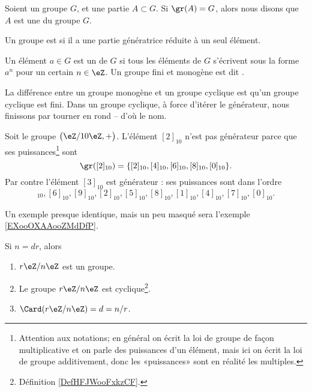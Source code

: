 \begin{definition}  \label{DEFooWMFVooLDqVxR}
	Soient un groupe \( G\), et une partie \( A\subset G\). Si \( \gr(A)=G\), alors nous disons que \( A\) est une  du groupe \( G\).

	Un groupe est  si il a une partie génératrice réduite à un seul élément.
\end{definition}

\begin{definition}     \label{DefHFJWooFxkzCF}
	Un élément \( a\in G\) est un  de \( G\) si tous les éléments de \( G\) s'écrivent sous la forme \( a^n\) pour un certain \( n\in\eZ\). Un groupe fini et monogène est dit .
\end{definition}

\begin{normaltext}
    La différence entre un groupe monogène et un groupe cyclique est qu'un groupe cyclique est fini. Dans un groupe cyclique, à force d'itérer le générateur, nous finissons par tourner en rond -- d'où le nom.
\end{normaltext}

\begin{example}
	Soit le groupe \( \big( \eZ/10\eZ,+ \big)\). L'élément \( [2]_{10}\) n'est pas générateur parce que ses puissances\footnote{Attention aux notations; en général on écrit la loi de groupe de façon multiplicative et on parle des puissances d'un élément, mais ici on écrit la loi de groupe additivement, donc les «puissances» sont en réalité les multiples.} sont
	\begin{equation}
		\gr([2]_{10})=\{ [2]_{10},[4]_{10},[6]_{10},[8]_{10},[0]_{10} \}.
	\end{equation}
	Par contre l'élément \( [3]_{10}\) est générateur : ses puissances sont dans l'ordre
	\begin{equation}
		[3]_{10}, [6]_{10}, [9]_{10}, [2]_{10}, [5]_{10}, [8]_{10},[1]_{10},[4]_{10},[7]_{10},[0]_{10}.
	\end{equation}
\end{example}

Un exemple presque identique, mais un peu masqué sera l'exemple \ref{EXooOXAAooZMdDfP}.


\begin{lemma}        \label{LEMooTHBIooJPjBlp}
    Si \( n=dr\), alors
    \begin{enumerate}
        \item
            \( r\eZ/n\eZ\) est un groupe.
        \item   \label{LEMooSAAXooMezYui}
            Le groupe \( r\eZ/n\eZ\) est cyclique\footnote{Définition \ref{DefHFJWooFxkzCF}.}.
        \item       \label{ITEMooGCGQooIfZULt}
            \( \Card(r\eZ/n\eZ)=d=n/r\).
    \end{enumerate}
\end{lemma}

